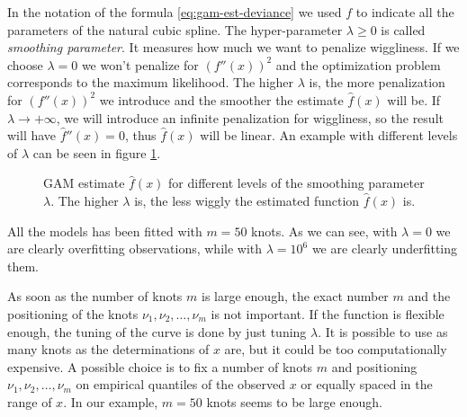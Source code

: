 \documentclass[a4paper, nobind]{templates/ociamthesis}
\theoremstyle{definition}
\theoremstyle{definition}
\theoremstyle{definition}
\theoremstyle{remark}
\begin{document}
In the notation of the formula \eqref{eq:gam-est-deviance} we used \(f\) to indicate all the parameters of the natural cubic spline. The hyper-parameter \(\lambda\ge0\) is called \emph{smoothing parameter}. It measures how much we want to penalize wiggliness. If we choose \(\lambda=0\) we won't penalize for \(\left( f''(x) \right)^2\) and the optimization problem corresponds to the maximum likelihood. The higher \(\lambda\) is, the more penalization for \(\left( f''(x) \right)^2\) we introduce and the smoother the estimate \(\hat{f}(x)\) will be. If \(\lambda\to+\infty\), we will introduce an infinite penalization for wiggliness, so the result will have \(\hat{f}''(x)=0\), thus \(\hat{f}(x)\) will be linear. An example with different levels of \(\lambda\) can be seen in figure \ref{fig:gam-lambda}.







\begin{figure}[!hbtp]

{\centering {}\newline{}

}

\caption[GAM estimate \(\hat{f}(x)\) for different levels of the smoothing parameter \(\lambda\).]{GAM estimate \(\hat{f}(x)\) for different levels of the smoothing parameter \(\lambda\). The higher \(\lambda\) is, the less wiggly the estimated function \(\hat{f}(x)\) is.}\label{fig:gam-lambda}
\end{figure}

All the models has been fitted with \(m = 50\) knots. As we can see, with \(\lambda = 0\) we are clearly overfitting observations, while with \(\lambda = 10^6\) we are clearly underfitting them.

As soon as the number of knots \(m\) is large enough, the exact number \(m\) and the positioning of the knots \(\nu_1, \nu_2, \dots, \nu_m\) is not important. If the function is flexible enough, the tuning of the curve is done by just tuning \(\lambda\). It is possible to use as many knots as the determinations of \(x\) are, but it could be too computationally expensive. A possible choice is to fix a number of knots \(m\) and positioning \(\nu_1, \nu_2, \dots, \nu_m\) on empirical quantiles of the observed \(x\) or equally spaced in the range of \(x\). In our example, \(m=50\) knots seems to be large enough.
\end{document}
